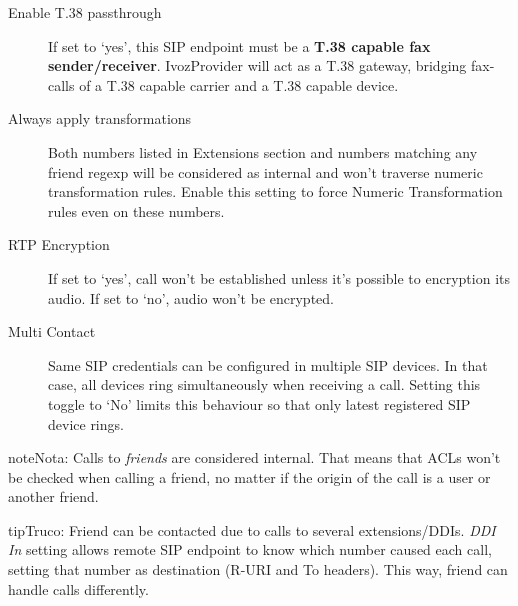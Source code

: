 \documentclass[letterpaper,10pt,spanish]{sphinxmanual}
\begin{document}
\begin{description}
\item[{Enable T.38 passthrough}] \leavevmode{}\label{administration_portal/client/vpbx/routing_endpoints/friends/remote_friends:term-enable-t-38-passthrough}
If set to `yes', this SIP endpoint must be a \textbf{T.38 capable fax sender/receiver}. IvozProvider
will act as a T.38 gateway, bridging fax-calls of a T.38 capable carrier and a T.38 capable device.

\item[{Always apply transformations}] \leavevmode{}\label{administration_portal/client/vpbx/routing_endpoints/friends/remote_friends:term-always-apply-transformations}
Both numbers listed in Extensions section and numbers matching any friend regexp will be considered as internal and
won't traverse numeric transformation rules.  Enable this setting to force Numeric Transformation rules even on these numbers.

\item[{RTP Encryption}] \leavevmode{}\label{administration_portal/client/vpbx/routing_endpoints/friends/remote_friends:term-rtp-encryption}
If set to `yes', call won't be established unless it's possible to encryption its audio. If set to `no',
audio won't be encrypted.

\item[{Multi Contact}] \leavevmode{}\label{administration_portal/client/vpbx/routing_endpoints/friends/remote_friends:term-multi-contact}
Same SIP credentials can be configured in multiple SIP devices. In that case, all devices ring
simultaneously when receiving a call. Setting this toggle to `No' limits this behaviour so that
only latest registered SIP device rings.

\end{description}

\begin{notice}{note}{Nota:}
Calls to \emph{friends} are considered internal. That means that ACLs won't
be checked when calling a friend, no matter if the origin of the call
is a user or another friend.
\end{notice}

\begin{notice}{tip}{Truco:}
Friend can be contacted due to calls to several extensions/DDIs. \emph{DDI In} setting allows remote SIP endpoint to
know which number caused each call, setting that number as destination (R-URI and To headers). This way, friend
can handle calls differently.
\end{notice}
\end{document}
